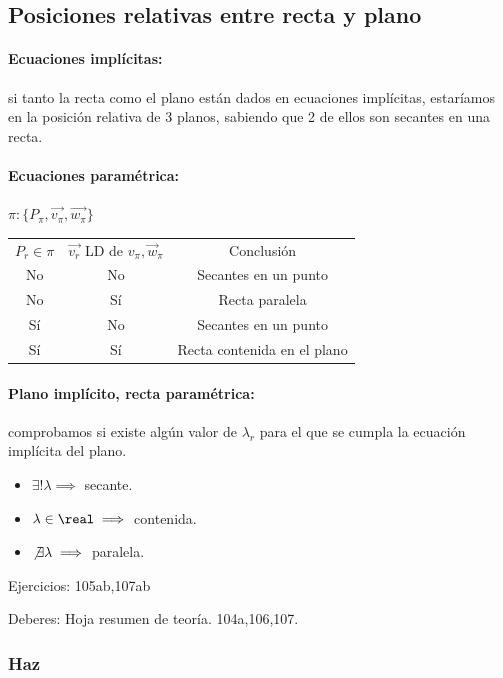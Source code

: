 \subsection{Posiciones relativas entre recta y plano}

\paragraph{Ecuaciones implícitas: } si tanto la recta como el plano están dados en ecuaciones implícitas, estaríamos en la posición relativa de 3 planos, sabiendo que 2 de ellos son secantes en una recta.

\paragraph{Ecuaciones paramétrica: } $\pi: \{P_{\pi},\vec{v_{\pi}}, \vec{w_{\pi}}\}$ 

\begin{center}
\begin{tabular}{ccc}
$P_r \in \pi $ & $\vec{v_r}$ LD de $v_{\pi}, \vec{w}_{\pi}$ & Conclusión\\
No & No & Secantes en un punto\\
No & Sí & Recta paralela\\
Sí & No & Secantes en un punto\\
Sí & Sí & Recta contenida en el plano\\
\end{tabular}
\end{center}

\paragraph{Plano implícito, recta paramétrica: } comprobamos si existe algún valor de $\lambda_{r}$ para el que se cumpla la ecuación implícita del plano. 
\begin{itemize}
  \item $\exists!\lambda \implies $ secante.
  \item $\lambda \in \real \implies$ contenida.
  \item $\not\exists \lambda \implies $ paralela.
\end{itemize}

Ejercicios: 105ab,107ab

Deberes: Hoja resumen de teoría. 104a,106,107.

\subsubsection{Haz}
